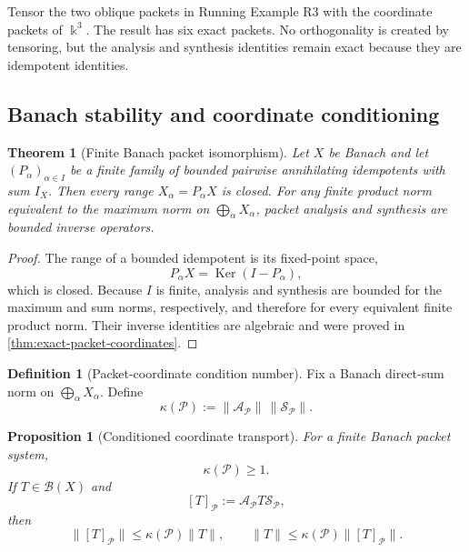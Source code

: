\documentclass[11pt]{article}
\newtheorem{theorem}{Theorem}[section]
\newtheorem{proposition}[proposition]{Proposition}
\theoremstyle{definition}
\newtheorem{definition}[definition]{Definition}
\theoremstyle{remark}
\theoremstyle{definition}\newtheorem{example}[theorem]{Example}
\newcommand{\bbk}{\Bbbk}
\newcommand{\Pcal}{\mathcal P}
\newcommand{\Ker}{\operatorname{Ker}}
\newcommand{\RecordID}[1]{\label{record:#1}}
\newcommand{\Depends}[1]{}
\begin{document}
\begin{microexample}[title={Tensoring the oblique packet split}]
Tensor the two oblique packets in Running Example R3 with the coordinate packets of \(\bbk^3\).  The result has six exact packets.  No orthogonality is created by tensoring, but the analysis and synthesis identities remain exact because they are idempotent identities.
\end{microexample}

\subsection{Banach stability and coordinate conditioning}
\begin{theorem}[Finite Banach packet isomorphism]
\label{thm:banach-packets}
Let $X$ be Banach and let $(P_\alpha)_{\alpha\in I}$ be a finite family of bounded pairwise annihilating idempotents with sum $I_X$.  Then every range $X_\alpha=P_\alpha X$ is closed.  For any finite product norm equivalent to the maximum norm on $\bigoplus_\alpha X_\alpha$, packet analysis and synthesis are bounded inverse operators.
\end{theorem}
\RecordID{PSC-I-T-BANACH-PACKET-ISOMORPHISM}
\Depends{PSC-I-T-EXACT-PACKET-COORDINATES.}

\begin{proof}
The range of a bounded idempotent is its fixed-point space,
\[
P_\alpha X=\Ker(I-P_\alpha),
\]
which is closed.  Because $I$ is finite, analysis and synthesis are bounded for the maximum and sum norms, respectively, and therefore for every equivalent finite product norm.  Their inverse identities are algebraic and were proved in \cref{thm:exact-packet-coordinates}.
\end{proof}

\begin{definition}[Packet-coordinate condition number]
\label{def:packet-condition-number}
Fix a Banach direct-sum norm on $\bigoplus_\alpha X_\alpha$.  Define
\[
\kappa(\Pcal):=
\|\mathcal A_{\Pcal}\|\,
\|\mathcal S_{\Pcal}\|.
\]
\end{definition}
\RecordID{PSC-I-D-PACKET-CONDITION-NUMBER}

\begin{proposition}[Conditioned coordinate transport]
\label{prop:conditioned-coordinates}
For a finite Banach packet system,
\[
\kappa(\Pcal)\geq1.
\]
If $T\in\mathcal B(X)$ and
\[
[T]_{\Pcal}:=\mathcal A_{\Pcal}T\mathcal S_{\Pcal},
\]
then
\[
\boxed{
\|[T]_{\Pcal}\|
\leq\kappa(\Pcal)\|T\|,
\qquad
\|T\|
\leq\kappa(\Pcal)\|[T]_{\Pcal}\|.
}
\]
\end{proposition}
\RecordID{PSC-I-P-CONDITIONED-COORDINATES}
\Depends{PSC-I-T-BANACH-PACKET-ISOMORPHISM.}
\end{document}
